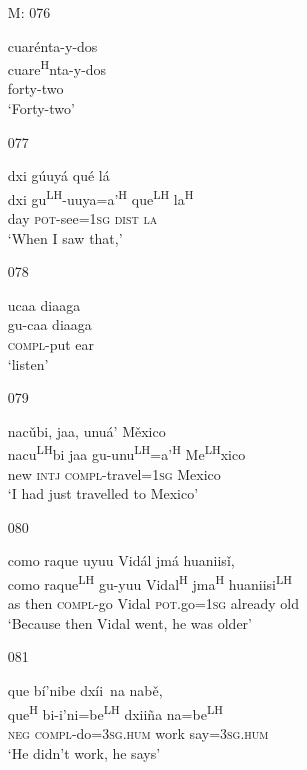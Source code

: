 \begin{itemize}
\item[M: 076]
 
\glll   cuar\'{e}nta-y-dos\\
cuare\textsuperscript{H}nta-y-dos\\
forty-two\\
\glt `Forty-two' 
 

\item[077]
 
\glll  dxi g\'{u}uy\'{a} qu\'{e} l\'{a}\\
dxi gu\textsuperscript{LH}-uuya=a'\textsuperscript{H} que\textsuperscript{LH} la\textsuperscript{H}\\
day \textsc{pot}-see=\textsc{1sg} \textsc{dist} \textsc{la}\\
\glt `When  I saw that,'
 

\item[078]
 
\glll  ucaa diaaga\\
gu-caa diaaga\\
\textsc{compl}-put ear\\
\glt `listen'
 


\item[079]
 
\glll   nac\v{u}bi, jaa, unu\'{a}' M\v{e}xico\\ 
nacu\textsuperscript{LH}bi jaa gu-unu\textsuperscript{LH}=a'\textsuperscript{H} Me\textsuperscript{LH}xico\\
new \textsc{intj} \textsc{compl}-travel=\textsc{1sg} Mexico\\
\glt `I had just travelled to Mexico'
 


\item[080]
 
\glll   como raque uyuu Vid\'{a}l jm\'{a} huaniis\v{i},\\
como raque\textsuperscript{LH} gu-yuu Vidal\textsuperscript{H}  jma\textsuperscript{H} huaniisi\textsuperscript{LH}\\
as then \textsc{compl}-go Vidal \textsc{pot}.go=\textsc{1sg} already old\\
\glt `Because then Vidal went, he was older' 
 


\item[081]
 
\glll   que b\'{i}'nibe dx\'{i}i~{n}a nab\v{e}, \\
que\textsuperscript{H} bi-i'ni=be\textsuperscript{LH} dxii\~{n}a na=be\textsuperscript{LH}\\
\textsc{neg} \textsc{compl}-do=\textsc{3sg.hum} work say=\textsc{3sg.hum}\\
\glt `He didn't work, he says'
 



\end{itemize}
